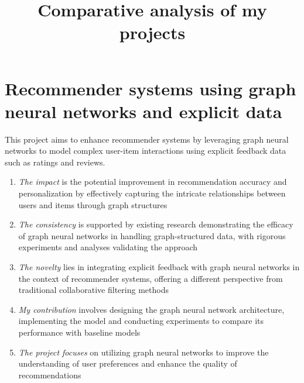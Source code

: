 \documentclass[12pt]{article}
\title{Comparative analysis of my projects}
\date{}
\begin{document}
\maketitle

\section{Recommender systems using graph neural networks and explicit data}
This project aims to enhance recommender systems by leveraging graph neural networks to model complex user-item interactions using
explicit feedback data such as ratings and reviews. 
\begin{enumerate}
\item \emph{The impact} is the potential improvement in recommendation accuracy and personalization by effectively capturing the intricate
relationships between users and items through graph structures
\item \emph{The consistency} is supported by existing research demonstrating the efficacy of graph neural networks in handling graph-structured data,
with rigorous experiments and analyses validating the approach
\item \emph{The novelty} lies in integrating explicit feedback with graph neural networks in the context of recommender systems, offering a different
perspective from traditional collaborative filtering methods
\item \emph{My contribution} involves designing the graph neural network architecture, implementing the model and conducting experiments to compare
its performance with baseline models
\item \emph{The project focuses} on utilizing graph neural networks to improve the understanding of user preferences and enhance the quality of
recommendations
\end{enumerate}
\end{document}
